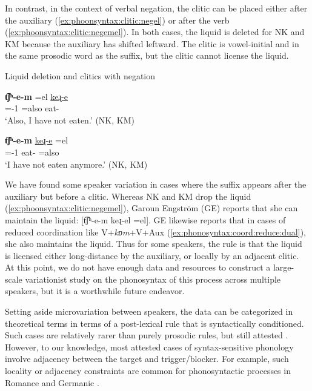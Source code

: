 In contrast,  in the context of verbal negation,  the clitic can be placed  either after the auxiliary (\ref{ex:phoonsyntax:clitic:negel})  or after the verb (\ref{ex:phoonsyntax:clitic:negemel}). In both cases, the liquid is deleted for NK and KM because the auxiliary has shifted leftward. The clitic is vowel-initial and in the same prosodic word as the suffix, but the clitic cannot license the liquid. 
 



\begin{exe}
	\ex Liquid deletion and clitics with negation
	\begin{xlist}
		\ex \gll \textbf{t͡ʃʰ\colorbox{lsLightGray}{-e-m}} =el \uline{{keɻ-e}} \\
		{\neggloss}={\auxgloss}-1{\sg} =also eat-{\perfcvb}\\
		\trans `Also, I have not eaten.'  \label{ex:phoonsyntax:clitic:negel}\hfill (NK, KM)
		\\
		
		
		\ex \gll \textbf{t͡ʃʰ\colorbox{lsLightGray}{-e-m}} \uline{{keɻ-e}} =el \\
		{\neggloss}={\auxgloss}-1{\sg}   eat-{\perfcvb} =also\\
		\trans `I have not eaten anymore.' \label{ex:phoonsyntax:clitic:negemel}\hfill (NK, KM)
		\\
		
	\end{xlist}
\end{exe}

\begin{sloppypar}
We have found some speaker variation in cases where the suffix appears after the auxiliary but before a clitic. Whereas NK and KM drop the liquid (\ref{ex:phoonsyntax:clitic:negemel}),  Garoun Engström (GE) reports that she can maintain the liquid: [t͡ʃʰ-e-m keɻ-el =el]. GE likewise reports that in cases of reduced coordination like V+\textit{kɒm}+V+Aux (\ref{ex:phonosyntax:coord:reduce:dual}), she also maintains the liquid. Thus for some speakers, the rule is   that the liquid is licensed either long-distance by the auxiliary, or locally by an adjacent clitic. At this point, we do not have enough data and resources to construct a large-scale variationist study on the phonosyntax of this process across multiple speakers, but it is a worthwhile future endeavor. 
\end{sloppypar}

Setting aside microvariation  between speakers, the data can be categorized in theoretical terms in terms of a post-lexical rule that is syntactically conditioned. Such cases are relatively rarer than purely prosodic rules, but still attested \citep{Selkirk-1986-DerivedDomains,Kaisse-1985-ConnectedSpeechSyntaxPhono}. 
However, to our knowledge, most attested cases of syntax-sensitive phonology involve     adjacency between the target and trigger/blocker.   For example, such locality or adjacency constraints are common for phonosyntactic processes in   Romance and Germanic  \citep{AckemaNeeleman-2003-ContextSensitiveSpellout,AckemaNeeleman-2004-BeyondMorpho,Sampson-2016-SandhiPhenomena,weisser-2019-tellingAllomorphyAgreement}. 

